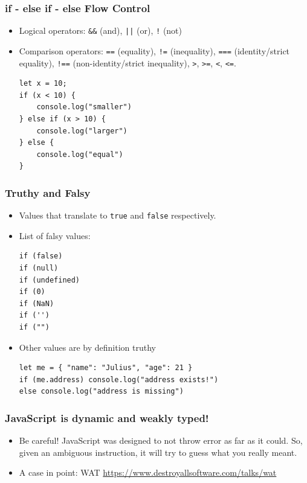 \documentclass[handout,12pt]{beamer}
\begin{document}
\begin{frame}[fragile]
	\frametitle{if - else if - else Flow Control}
	\begin{itemize}
		\item Logical operators: \texttt{\&\&} (and), \texttt{||} (or), \texttt{!} (not)\pause
		\item Comparison operators: \texttt{==} (equality), \texttt{!=} (inequality), \texttt{===} (identity/strict equality), \texttt{!==} (non-identity/strict inequality), \texttt{>}, \texttt{>=}, \texttt{<}, \texttt{<=}.\pause
		\begin{verbatim}
let x = 10;
if (x < 10) {
	console.log("smaller")
} else if (x > 10) {
	console.log("larger")
} else {
	console.log("equal")
}
		\end{verbatim}
	\end{itemize}
\end{frame}

\begin{frame}[fragile]
	\frametitle{Truthy and Falsy}
	\begin{itemize}
		\item Values that translate to \texttt{true} and \texttt{false} respectively.
		\item List of falsy values:
		\begin{verbatim}
if (false)
if (null)
if (undefined)
if (0)
if (NaN)
if ('')
if ("")
		\end{verbatim}
		\item Other values are by definition truthy
		\begin{verbatim}
let me = { "name": "Julius", "age": 21 }
if (me.address) console.log("address exists!")
else console.log("address is missing")
		\end{verbatim}
	\end{itemize}
\end{frame}

\begin{frame}
	\frametitle{JavaScript is dynamic and weakly typed!}
	\begin{itemize}
		\item Be careful! JavaScript was designed to not throw error as far as it could. So, given an ambiguous instruction, it will try to guess what you really meant.
		\item A case in point: WAT \url{https://www.destroyallsoftware.com/talks/wat}
	\end{itemize}
\end{frame}
\end{document}
